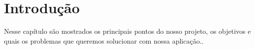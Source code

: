 
\chapter[Introdução]{Introdução}
Nesse capítulo são mostrados os principais pontos do nosso projeto, os objetivos e quais os problemas que queremos solucionar com nossa aplicação..










